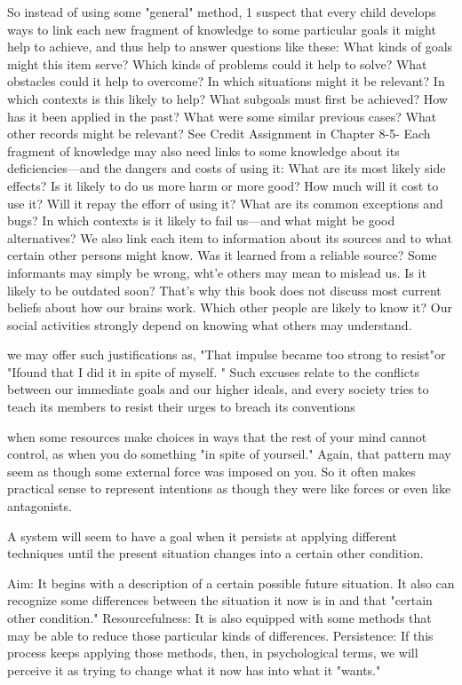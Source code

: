 \documentclass[10pt,a4paper]{article}
\begin{document}
So instead of using some "general" method, 1 suspect that every child develops ways to link each new fragment of knowledge to some particular goals it might help to achieve, and thus help to answer questions like these:
What kinds of goals might this item serve? Which kinds of problems could it help to solve? What obstacles could it help to overcome? In which situations might it be relevant? In which contexts is this likely to help? What subgoals must first be achieved? How has it been applied in the past? What were some similar previous cases? What other records might be relevant? See Credit Assignment in Chapter 8-5-
Each fragment of knowledge may also need links to some knowledge about its deficiencies—and the dangers and costs of using it:
What are its most likely side effects? Is it likely to do us more harm or more good? How much will it cost to use it? Will it repay the efforr of using it? What are its common exceptions and bugs? In which contexts is it likely to fail us—and what might be good alternatives?
We also link each item to information about its sources and to what certain other persons might know.
Was it learned from a reliable source? Some informants may simply
be wrong, wht'e others may mean to mislead us. Is it likely to be outdated soon? That's why this book does not discuss most current beliefs about how our brains work. Which other people are likely to know it? Our social activities strongly depend on knowing what others may understand.\cite[p.~183-184]{minsky}

we may offer such justifications as, "That impulse became too strong to resist"or "Ifound that I did it in spite of myself. " Such excuses relate to the conflicts between our immediate goals and our higher ideals, and every society tries to teach its members to resist their urges to breach its conventions \cite[p.~185]{minsky}

when some resources make choices in ways that the rest of your mind cannot control, as when you do something "in spite of yourseil." Again, that pattern may seem as though some external force was imposed on you. So it often makes practical sense to represent intentions as though they were like forces or even like antagonists. \cite[p.~186]{minsky}

A system will seem to have a goal when it persists at applying different techniques until the present situation changes into a certain other condition. \cite[p.~187]{minsky}

Aim: It begins with a description of a certain possible future situation. It also can recognize some differences between the situation it now is in and that "certain other condition."
Resourcefulness: It is also equipped with some methods that may be able to reduce those particular kinds of differences.
Persistence: If this process keeps applying those methods, then, in psychological terms, we will perceive it as trying to change what it now has into what it "wants." \cite[p.~188]{minsky}
\end{document}
